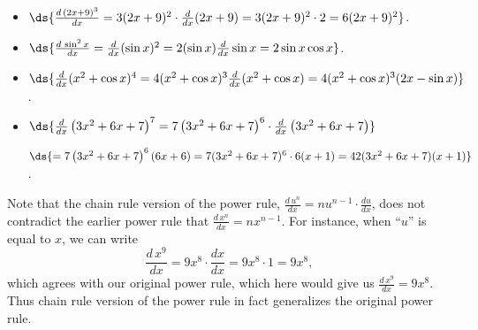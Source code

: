 \begin{itemize}
\item $\ds{\frac{d\,(2x+9)^3}{dx}=3(2x+9)^2\cdot\frac{d}{dx}(2x+9)
                     =3(2x+9)^2\cdot2=6(2x+9)^2}$.
\item $\ds{\frac{d\,\sin^2x}{dx}
             =\frac{d}{dx}(\sin x)^2
             =2(\sin x)\frac{d}{dx}\sin x
             =2\sin x\cos x}$.
\item $\ds{\frac{d}{dx}(x^2+\cos x)^4=
            4(x^2+\cos x)^3\frac{d}{dx}(x^2+\cos x)
            =4(x^2+\cos x)^3(2x-\sin x)}$.
\item $\ds{\frac{d}{dx}\left(3x^2+6x+7\right)^7
            =7\left(3x^2+6x+7\right)^6\cdot
             \frac{d}{dx}\left(3x^2+6x+7\right)}$

            \qquad $\ds{=7\left(3x^2+6x+7\right)^6\left(6x+6\right)
            =7(3x^2+6x+7)^6\cdot6(x+1)=42(3x^2+6x+7)(x+1)}$.
\end{itemize}
Note that the chain rule version of the power rule,
$\frac{d\,u^n}{dx}=nu^{n-1}\cdot\frac{du}{dx}$,
does not contradict the earlier power rule that $\frac{d\,x^n}{dx}
=nx^{n-1}$. 
For instance, when ``$u$'' is equal to $x$, we can write
$$\frac{d\,x^9}{dx}=9x^8\cdot\frac{dx}{dx}=9x^8\cdot1=9x^8,$$
which agrees with our original power rule, which here would
give us $\frac{d\,x^9}{dx}=9x^8$. Thus chain rule version of the power rule
in fact generalizes the original power rule.
